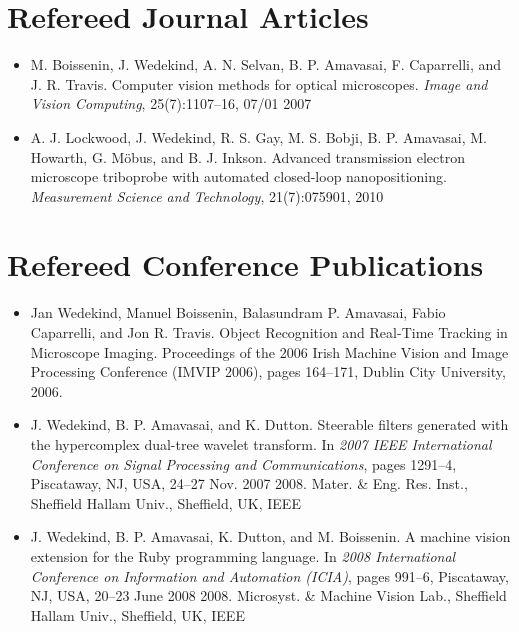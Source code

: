 \documentclass[12pt,a4paper,oneside,openright]{book}
\begin{document}
\begin{CJK}{UTF8}{}
\section*{Refereed Journal Articles}
\begin{itemize}
\item M. Boissenin, J. Wedekind, A. N. Selvan, B. P. Amavasai, F. Caparrelli, and J. R. Travis. Computer vision methods for optical microscopes. \emph{Image and Vision Computing}, 25(7):1107--16, 07/01 2007~\citep{RefWorks:438}
\item A. J. Lockwood, J. Wedekind, R. S. Gay, M. S. Bobji, B. P. Amavasai, M. Howarth, G. Möbus, and B. J. Inkson. Advanced transmission electron microscope triboprobe with automated closed-loop nanopositioning. \emph{Measurement Science and Technology}, 21(7):075901, 2010~\citep{0957-0233-21-7-075901}
\end{itemize}

\section*{Refereed Conference Publications}
\begin{itemize}
\item Jan Wedekind, Manuel Boissenin, Balasundram P. Amavasai, Fabio Caparrelli, and Jon R. Travis. Object Recognition and Real-Time Tracking in Microscope Imaging. Proceedings of the 2006 Irish Machine Vision and Image Processing Conference (IMVIP 2006), pages 164--171, Dublin City University, 2006.~\citep{RefWorks:431}
\item J. Wedekind, B. P. Amavasai, and K. Dutton. Steerable filters generated with the hypercomplex dual-tree wavelet transform. In \emph{2007 IEEE International Conference on Signal Processing and Communications}, pages 1291--4, Piscataway, NJ, USA, 24--27 Nov. 2007 2008. Mater. \& Eng. Res. Inst., Sheffield Hallam Univ., Sheffield, UK, IEEE~\citep{RefWorks:581}
\item J. Wedekind, B. P. Amavasai, K. Dutton, and M. Boissenin. A machine vision extension for the Ruby programming language. In \emph{2008 International Conference on Information and Automation (ICIA)}, pages 991--6, Piscataway, NJ, USA, 20--23 June 2008 2008. Microsyst. \& Machine Vision Lab., Sheffield Hallam Univ., Sheffield, UK, IEEE~\citep{RefWorks:560}
\end{itemize}


\end{CJK}
\end{document}
